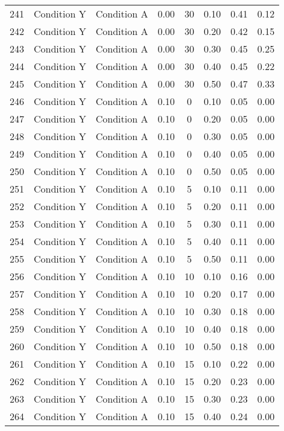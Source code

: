 \begin{landscape}
\begin{longtable}{cc cc cc cc}
  241 & Condition Y & Condition A & 0.00 &  30 & 0.10 & 0.41 & 0.12 \\ 
  242 & Condition Y & Condition A & 0.00 &  30 & 0.20 & 0.42 & 0.15 \\ 
  243 & Condition Y & Condition A & 0.00 &  30 & 0.30 & 0.45 & 0.25 \\ 
  244 & Condition Y & Condition A & 0.00 &  30 & 0.40 & 0.45 & 0.22 \\ 
  245 & Condition Y & Condition A & 0.00 &  30 & 0.50 & 0.47 & 0.33 \\ 
  246 & Condition Y & Condition A & 0.10 &   0 & 0.10 & 0.05 & 0.00 \\ 
  247 & Condition Y & Condition A & 0.10 &   0 & 0.20 & 0.05 & 0.00 \\ 
  248 & Condition Y & Condition A & 0.10 &   0 & 0.30 & 0.05 & 0.00 \\ 
  249 & Condition Y & Condition A & 0.10 &   0 & 0.40 & 0.05 & 0.00 \\ 
  250 & Condition Y & Condition A & 0.10 &   0 & 0.50 & 0.05 & 0.00 \\ 
  251 & Condition Y & Condition A & 0.10 &   5 & 0.10 & 0.11 & 0.00 \\ 
  252 & Condition Y & Condition A & 0.10 &   5 & 0.20 & 0.11 & 0.00 \\ 
  253 & Condition Y & Condition A & 0.10 &   5 & 0.30 & 0.11 & 0.00 \\ 
  254 & Condition Y & Condition A & 0.10 &   5 & 0.40 & 0.11 & 0.00 \\ 
  255 & Condition Y & Condition A & 0.10 &   5 & 0.50 & 0.11 & 0.00 \\ 
  256 & Condition Y & Condition A & 0.10 &  10 & 0.10 & 0.16 & 0.00 \\ 
  257 & Condition Y & Condition A & 0.10 &  10 & 0.20 & 0.17 & 0.00 \\ 
  258 & Condition Y & Condition A & 0.10 &  10 & 0.30 & 0.18 & 0.00 \\ 
  259 & Condition Y & Condition A & 0.10 &  10 & 0.40 & 0.18 & 0.00 \\ 
  260 & Condition Y & Condition A & 0.10 &  10 & 0.50 & 0.18 & 0.00 \\ 
  261 & Condition Y & Condition A & 0.10 &  15 & 0.10 & 0.22 & 0.00 \\ 
  262 & Condition Y & Condition A & 0.10 &  15 & 0.20 & 0.23 & 0.00 \\ 
  263 & Condition Y & Condition A & 0.10 &  15 & 0.30 & 0.23 & 0.00 \\ 
  264 & Condition Y & Condition A & 0.10 &  15 & 0.40 & 0.24 & 0.00 \\ 

\end{longtable}
\end{landscape}
